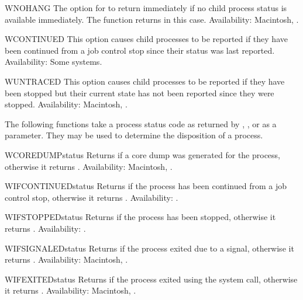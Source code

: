 \begin{datadesc}{WNOHANG}
The option for  to return immediately if no child
process status is available immediately. The function returns
 in this case.
Availability: Macintosh, \UNIX.
\end{datadesc}

\begin{datadesc}{WCONTINUED}
This option causes child processes to be reported if they have been
continued from a job control stop since their status was last
reported.
Availability: Some \UNIX{} systems.
\end{datadesc}

\begin{datadesc}{WUNTRACED}
This option causes child processes to be reported if they have been
stopped but their current state has not been reported since they were
stopped.
Availability: Macintosh, \UNIX.
\end{datadesc}

The following functions take a process status code as returned by
, , or  as a
parameter.  They may be used to determine the disposition of a
process.

\begin{funcdesc}{WCOREDUMP}{status}
Returns  if a core dump was generated for the process,
otherwise it returns .
Availability: Macintosh, \UNIX.
\end{funcdesc}

\begin{funcdesc}{WIFCONTINUED}{status}
Returns  if the process has been continued from a job
control stop, otherwise it returns .
Availability: \UNIX.
\end{funcdesc}

\begin{funcdesc}{WIFSTOPPED}{status}
Returns  if the process has been stopped, otherwise it
returns .
Availability: \UNIX.
\end{funcdesc}

\begin{funcdesc}{WIFSIGNALED}{status}
Returns  if the process exited due to a signal, otherwise
it returns .
Availability: Macintosh, \UNIX.
\end{funcdesc}

\begin{funcdesc}{WIFEXITED}{status}
Returns  if the process exited using the 
system call, otherwise it returns .
Availability: Macintosh, \UNIX.
\end{funcdesc}

